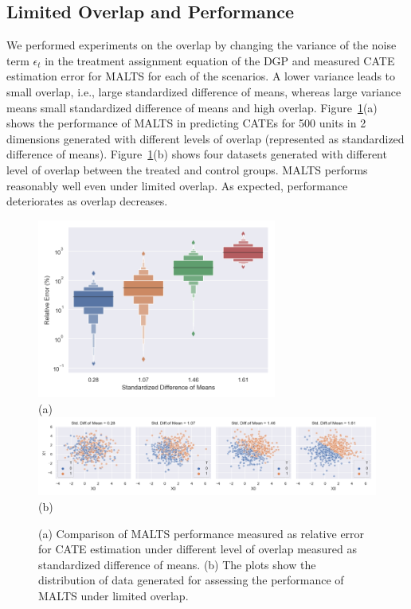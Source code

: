 \subsection*{Limited Overlap and Performance}
We performed experiments on the overlap by changing the variance of the noise term $\epsilon_t$ in the treatment assignment equation of the DGP and measured CATE estimation error for MALTS for each of the scenarios. A lower variance leads to small overlap, i.e., large standardized difference of means, whereas large variance means small standardized difference of means and high overlap.
Figure~\ref{fig:overlap}(a) shows the performance of MALTS in predicting CATEs for 500 units in  2 dimensions generated with different levels of overlap (represented as standardized difference of means). Figure~\ref{fig:overlap}(b) shows four datasets generated with different level of overlap between the treated and control groups. MALTS performs reasonably well even under limited overlap. As expected, performance deteriorates as overlap decreases.
    \begin{figure}
        \centering
        \includegraphics[width = 0.7\textwidth]{Figures/overlap.png}\\
        (a)\\
        \includegraphics[width = \textwidth]{Figures/overlap_space.png}\\
        (b)
        \caption{(a) Comparison of MALTS performance measured as relative error for CATE estimation under different level of overlap measured as standardized difference of means. (b) The plots show the distribution of data generated for assessing the performance of MALTS under limited overlap.}
        \label{fig:overlap}
    \end{figure}
    
